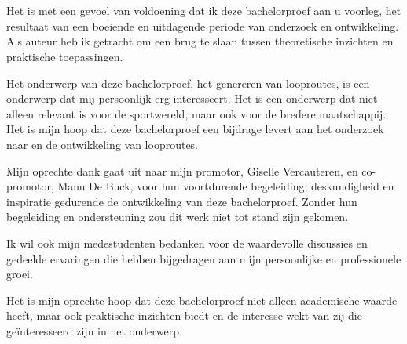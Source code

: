 
\chapter*{}%
\label{ch:voorwoord}

Het is met een gevoel van voldoening dat ik deze bachelorproef aan u voorleg, het resultaat van een boeiende en uitdagende periode van onderzoek en ontwikkeling. Als auteur heb ik getracht om een brug te slaan tussen theoretische inzichten en praktische toepassingen.

Het onderwerp van deze bachelorproef, het genereren van looproutes, is een onderwerp dat mij persoonlijk erg interesseert. Het is een onderwerp dat niet alleen relevant is voor de sportwereld, maar ook voor de bredere maatschappij. Het is mijn hoop dat deze bachelorproef een bijdrage levert aan het onderzoek naar en de ontwikkeling van looproutes.

Mijn oprechte dank gaat uit naar mijn promotor, Giselle Vercauteren, en co-promotor, Manu De Buck, voor hun voortdurende begeleiding, deskundigheid en inspiratie gedurende de ontwikkeling van deze bachelorproef. Zonder hun begeleiding en ondersteuning zou dit werk niet tot stand zijn gekomen.

Ik wil ook mijn medestudenten bedanken voor de waardevolle discussies en gedeelde ervaringen die hebben bijgedragen aan mijn persoonlijke en professionele groei.

Het is mijn oprechte hoop dat deze bachelorproef niet alleen academische waarde heeft, maar ook praktische inzichten biedt en de interesse wekt van zij die geïnteresseerd zijn in het onderwerp.


